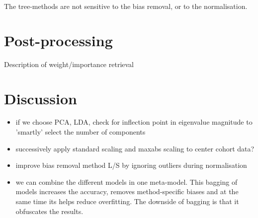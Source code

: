 \documentclass[a4paper,10pt]{article}
\begin{document}
The tree-methods are not sensitive to the bias removal, or to the normalisation.
\section{Post-processing}
%
Description of weight/importance retrieval

\section{Discussion}

\begin{itemize}
\item if we choose PCA, LDA, check for inflection point in eigenvalue magnitude to 'smartly' select the number of components
\item successively apply standard scaling and maxabs scaling to center cohort data?
\item improve bias removal method L/S by ignoring outliers during normalisation
\item we can combine the different models in one meta-model. This bagging of models increases the accuracy, removes method-specific biases and at the same time its helps reduce overfitting.
The downside of bagging is that it obfuscates the results.
\end{itemize}



\end{document}
